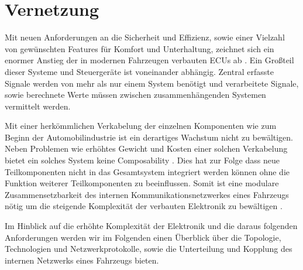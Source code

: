 
\section{Vernetzung}
Mit neuen Anforderungen an die Sicherheit und Effizienz, sowie einer Vielzahl von gewünschten Features 
für Komfort und Unterhaltung, zeichnet sich ein enormer Anstieg der in modernen Fahrzeugen verbauten ECUs ab \cite{TW_kim2014gateway}.
Ein Großteil dieser Systeme und Steuergeräte ist voneinander abhängig. Zentral erfasste Signale werden von mehr als nur einem
System benötigt und verarbeitete Signale, sowie berechnete Werte müssen zwischen zusammenhängenden Systemen vermittelt werden.

Mit einer herkömmlichen Verkabelung der einzelnen Komponenten wie zum Beginn der Automobilindustrie ist ein derartiges Wachstum
nicht zu bewältigen. Neben Problemen wie erhöhtes Gewicht und Kosten einer solchen Verkabelung bietet ein solches System keine
Composability \cite{reif2011bosch}. Dies hat zur Folge dass neue Teilkomponenten nicht in das Gesamtsystem integriert werden können ohne die Funktion 
weiterer Teilkomponenten zu beeinflussen. Somit ist eine modulare Zusammensetzbarkeit des internen Kommunikationsnetzwerkes eines Fahrzeugs nötig um die 
steigende Komplexität der verbauten Elektronik zu bewältigen \cite{reif2011bosch}.

Im Hinblick auf die erhöhte Komplexität der Elektronik und die daraus folgenden Anforderungen werden wir im Folgenden
einen Überblick über die Topologie, Technologien und Netzwerkprotokolle, sowie die Unterteilung und Kopplung des internen Netzwerks eines Fahrzeugs bieten.

